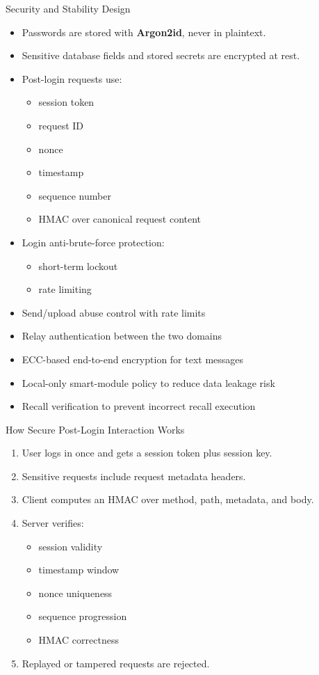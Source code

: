 \documentclass[aspectratio=169]{beamer}
\begin{document}
\begin{frame}{Security and Stability Design}
  \begin{itemize}
    \item Passwords are stored with \textbf{Argon2id}, never in plaintext.
    \item Sensitive database fields and stored secrets are encrypted at rest.
    \item Post-login requests use:
    \begin{itemize}
      \item session token
      \item request ID
      \item nonce
      \item timestamp
      \item sequence number
      \item HMAC over canonical request content
    \end{itemize}
    \item Login anti-brute-force protection:
    \begin{itemize}
      \item short-term lockout
      \item rate limiting
    \end{itemize}
    \item Send/upload abuse control with rate limits
    \item Relay authentication between the two domains
    \item ECC-based end-to-end encryption for text messages
    \item Local-only smart-module policy to reduce data leakage risk
    \item Recall verification to prevent incorrect recall execution
  \end{itemize}
\end{frame}

\begin{frame}{How Secure Post-Login Interaction Works}
  \begin{enumerate}
    \item User logs in once and gets a session token plus session key.
    \item Sensitive requests include request metadata headers.
    \item Client computes an HMAC over method, path, metadata, and body.
    \item Server verifies:
    \begin{itemize}
      \item session validity
      \item timestamp window
      \item nonce uniqueness
      \item sequence progression
      \item HMAC correctness
    \end{itemize}
    \item Replayed or tampered requests are rejected.
  \end{enumerate}
\end{frame}
\end{document}
